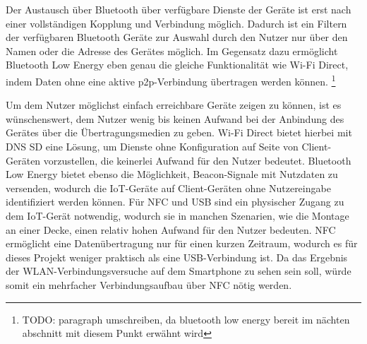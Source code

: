     Der Austausch über Bluetooth über verfügbare Dienste der Geräte ist erst nach einer vollständigen Kopplung und Verbindung möglich.
    Dadurch ist ein Filtern der verfügbaren Bluetooth Geräte zur Auswahl durch den Nutzer nur über den Namen oder die Adresse des Gerätes möglich.
    Im Gegensatz dazu ermöglicht Bluetooth Low Energy eben genau die gleiche Funktionalität wie Wi-Fi Direct, indem Daten ohne eine aktive p2p-Verbindung übertragen werden können.
    \footnote{TODO: paragraph umschreiben, da bluetooth low energy bereit im nächten abschnitt mit diesem Punkt erwähnt wird}

    Um dem Nutzer möglichst einfach erreichbare Geräte zeigen zu können, ist es wünschenswert, dem Nutzer wenig bis keinen Aufwand bei der Anbindung des Gerätes über die Übertragungsmedien zu geben.
    Wi-Fi Direct bietet hierbei mit DNS SD eine Lösung, um Dienste ohne Konfiguration auf Seite von Client-Geräten vorzustellen, die keinerlei Aufwand für den Nutzer bedeutet.
    Bluetooth Low Energy bietet ebenso die Möglichkeit, Beacon-Signale mit Nutzdaten zu versenden, wodurch die IoT-Geräte auf Client-Geräten ohne Nutzereingabe identifiziert werden können.
    Für NFC und USB sind ein physischer Zugang zu dem IoT-Gerät notwendig, wodurch sie in manchen Szenarien, wie die Montage an einer Decke, einen relativ hohen Aufwand für den Nutzer bedeuten.
    NFC ermöglicht eine Datenübertragung nur für einen kurzen Zeitraum, wodurch es für dieses Projekt weniger praktisch als eine USB-Verbindung ist.
    Da das Ergebnis der WLAN-Verbindungsversuche auf dem Smartphone zu sehen sein soll, würde somit ein mehrfacher Verbindungsaufbau über NFC nötig werden.
